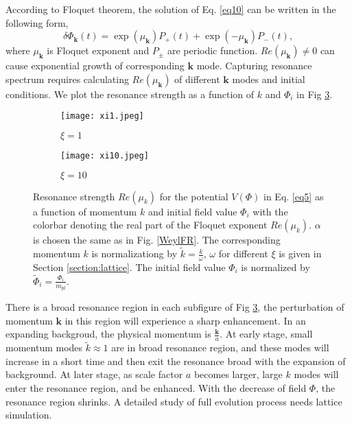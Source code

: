 \documentclass[12pt, a4paper]{article}
\begin{document}
According to Floquet theorem, the solution of Eq. \ref{eq10} can be written in the following form,
\begin{equation}
  \delta\Phi_{\bm{k}}\left(t\right)=\exp\left(\mu_{\bm{k}}\right)P_{+}\left(t\right)+\exp\left(-\mu_{\bm{k}}\right)P_{-}\left(t\right),
\end{equation}
where $\mu_{\bm{k}}$ is Floquet exponent and $P_{\pm}$ are periodic function. $Re\left(\mu_{\bm{k}}\right)  \neq 0$ can cause exponential growth of corresponding $\bm{k}$ mode.
Capturing resonance spectrum requires calculating $Re\left(\mu_{\bm{k}}\right)$ of different $\bm{k}$ modes and initial conditions. We plot the resonance strength as  a function of $k$
and $\Phi_i$ in Fig \ref{fig:fig2}.
\begin{figure}[t]
  \centering
  \begin{subfigure}[b]{0.48\textwidth}
    \texttt{[image: xi1.jpeg]}
    \caption{$\xi=1$}
    \label{fig:fig2subfig1}
  \end{subfigure}
  \hfill
  \begin{subfigure}[b]{0.48\textwidth}
    \texttt{[image: xi10.jpeg]}
    \caption{$\xi=10$}
    \label{fig:fig2subfig2}
  \end{subfigure}

  \caption{Resonance strength $Re\left(\mu_k\right)$ for the potential $V\left(\Phi\right)$ in 
  Eq. \ref{eq5} as a function of momentum $k$ and initial field value $\Phi_i$ with the colorbar 
  denoting the real part of the Floquet exponent $Re\left(\mu_k\right)$. $\alpha$ is 
  chosen the same as in Fig. \ref{WeylFR}. The corresponding momentum $k$ is normalizationg 
  by $\tilde{k}=\frac{k}{\omega}$, $\omega$ for different $\xi$ is given in Section \ref{section:lattice}. 
  The initial field value $\Phi_i$ is normalized by $\tilde{\Phi}_i=\frac{\Phi_i}{m_{pl}}$.} 
  \label{fig:fig2}
\end{figure}
There is a broad resonance region in each subfigure of Fig \ref{fig:fig2}, the perturbation of momentum $\bm{k}$ in this region will
experience a sharp enhancement. In an expanding backgroud, the physical momentum is $\frac{\bm{k}}{a}$. At early stage, small momentum modes $\tilde{k}\approx 1$ are in broad resonance region, and these modes will increase in a short time and then exit the resonance broad with the expansion of background. At later stage, 
as scale factor $a$ becomes larger, large $k$ modes will enter the resonance region, and be enhanced. With the decrease of field $\Phi$, the resonance region shrinks. A detailed study of full evolution process needs lattice simulation.
\end{document}
